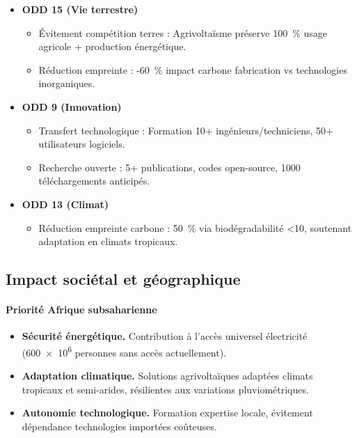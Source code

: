 \documentclass[12pt, a4paper]{article}
\begin{document}
\begin{itemize}
    \item \textbf{ODD 15 (Vie terrestre)}
    \begin{itemize}
        \item Évitement compétition terres : Agrivoltaïsme préserve \SI{100}{\percent} usage agricole + production énergétique.
        \item Réduction empreinte : -\SI{60}{\percent} impact carbone fabrication vs technologies inorganiques.
    \end{itemize}
    \item \textbf{ODD 9 (Innovation)}
    \begin{itemize}
        \item Transfert technologique : Formation 10+ ingénieurs/techniciens, 50+ utilisateurs logiciels.
        \item Recherche ouverte : 5+ publications, codes open-source, \num{1000} téléchargements anticipés.
\end{itemize}
    
    \item \textbf{ODD 13 (Climat)}
    \begin{itemize}
        \item Réduction empreinte carbone : \SI{50}{\percent} via biodégradabilité \SI{<10}{\year}, soutenant adaptation en climats tropicaux.
\end{itemize}
\end{itemize}

\subsection{Impact sociétal et géographique}

\paragraph{Priorité Afrique subsaharienne}
\begin{itemize}
    \item \textbf{Sécurité énergétique.} Contribution à l'accès universel électricité (\num{600e6} personnes sans accès actuellement).
    \item \textbf{Adaptation climatique.} Solutions agrivoltaïques adaptées climats tropicaux et semi-arides, résilientes aux variations pluviométriques.
    \item \textbf{Autonomie technologique.} Formation expertise locale, évitement dépendance technologies importées coûteuses.
\end{itemize}
\end{document}
